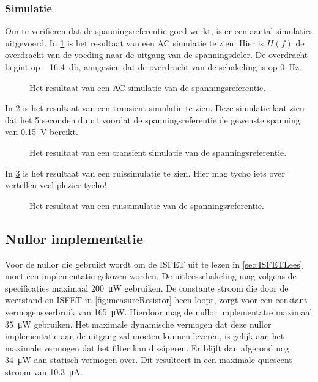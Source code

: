 \subsubsection{Simulatie}
Om te verifiëren dat de spanningsreferentie goed werkt, is er een aantal simulaties uitgevoerd.
In \cref{fig:referenceSimFreq} is het resultaat van een AC simulatie te zien. Hier is $H(f)$ de overdracht van de voeding naar de uitgang van de spanningsdeler. De overdracht begint op \qty{-16.4}{\decibel}, aangezien dat de overdracht van de schakeling is op \qty{0}{\hertz}.

\begin{figure}[!htbp]
    \centering
    \pgfplotsset{width=0.7\textwidth}
    
    \caption{Het resultaat van een AC simulatie van de spanningsreferentie.}
    \label{fig:referenceSimFreq}
\end{figure}

In \cref{fig:referenceSimTrans} is het resultaat van een transient simulatie te zien. Deze simulatie laat zien dat het 5 seconden duurt voordat de spanningsreferentie de gewenste spanning van \qty{0.15}{\volt} bereikt.
\begin{figure}[!htbp]
    \centering
    \pgfplotsset{width=0.7\textwidth}
    
    \caption{Het resultaat van een transient simulatie van de spanningsreferentie.}
    \label{fig:referenceSimTrans}
\end{figure}

In \cref{fig:referenceSimNoise} is het resultaat van een ruissimulatie te zien. Hier mag tycho iets over vertellen veel plezier tycho!%
\begin{figure}[!htbp]
    \centering
    \pgfplotsset{width=0.7\textwidth}
    
    \caption{Het resultaat van een ruissimulatie van de spanningsreferentie.}
    \label{fig:referenceSimNoise}
\end{figure}


\subsection{Nullor implementatie}
Voor de nullor die gebruikt wordt om de ISFET uit te lezen in \cref{sec:ISFETLees} moet een implementatie gekozen worden. De uitleesschakeling mag volgens de specificaties maximaal \qty{200}{\micro\watt}  gebruiken. De constante stroom die door de weerstand en ISFET in \cref{fig:measureResistor} heen loopt, zorgt voor een constant vermogensverbruik van \qty{165}{\micro\watt}. Hierdoor mag de nullor implementatie maximaal \qty{35}{\micro\watt} gebruiken. Het maximale dynamische vermogen dat deze nullor implementatie aan de uitgang zal moeten kunnen leveren, is gelijk aan het maximale vermogen dat het filter kan dissiperen. Er blijft dan afgerond nog \qty{34}{\micro\watt} aan statisch vermogen over. Dit resulteert in een maximale quiescent stroom van \qty{10.3}{\micro\ampere}.


